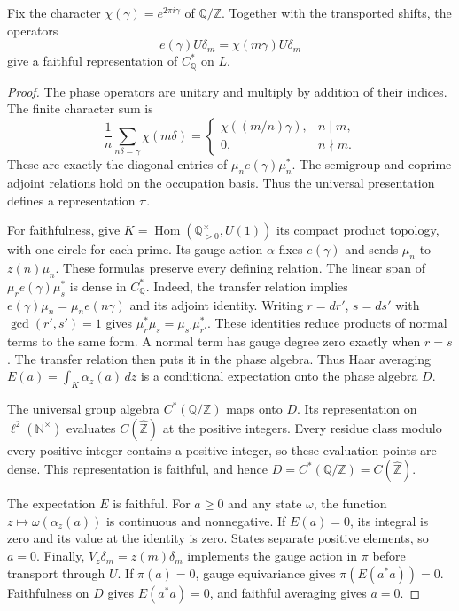 \begin{proposition}
\label{v4-arith:thm:BC-acts-on-L}

Fix the character $\chi(\gamma)=e^{2\pi i\gamma}$ of
$\mathbb Q/\mathbb Z$.
Together with the transported shifts, the operators
\[
 e(\gamma)U\delta_m=\chi(m\gamma)U\delta_m
\]
give a faithful representation of $C_{\mathbb Q}^*$ on $L$.
\end{proposition}
\begin{proof}
The phase operators are unitary and multiply by addition of their
indices. The finite character sum is
\[
 \frac1n\sum_{n\delta=\gamma}\chi(m\delta)=
 \begin{cases}
 \chi((m/n)\gamma),&n\mid m,\\
 0,&n\nmid m.
 \end{cases}
\]
These are exactly the diagonal entries of
$\mu_ne(\gamma)\mu_n^*$.
The semigroup and coprime adjoint relations hold on the occupation
basis. Thus the universal presentation defines a representation $\pi$.

For faithfulness, give
$K=\operatorname{Hom}(\mathbb Q_{>0}^{\times},U(1))$
its compact product topology, with one circle for each prime.
Its gauge action $\alpha$ fixes $e(\gamma)$ and sends $\mu_n$ to
$z(n)\mu_n$. These formulas preserve every defining relation.
The linear span of $\mu_r e(\gamma)\mu_s^*$ is dense in
$C_{\mathbb Q}^*$.
Indeed, the transfer relation implies
$e(\gamma)\mu_n=\mu_ne(n\gamma)$ and its adjoint identity.
Writing $r=dr'$, $s=ds'$ with $\gcd(r',s')=1$ gives
$\mu_r^*\mu_s=\mu_{s'}\mu_{r'}^*$.
These identities reduce products of normal terms to the same form.
A normal term has gauge degree zero exactly when $r=s$.
The transfer relation then puts it in the phase algebra.
Thus Haar averaging
$E(a)=\int_K\alpha_z(a)\,dz$ is a conditional expectation onto
the phase algebra $D$.

The universal group algebra $C^*(\mathbb Q/\mathbb Z)$ maps onto $D$.
Its representation on $\ell^2(\mathbb N^\times)$ evaluates
$C(\widehat{\mathbb Z})$ at the positive integers.
Every residue class modulo every positive integer contains a positive
integer, so these evaluation points are dense.
This representation is faithful, and hence
$D=C^*(\mathbb Q/\mathbb Z)=C(\widehat{\mathbb Z})$.

The expectation $E$ is faithful.
For $a\geq0$ and any state $\omega$, the function
$z\mapsto\omega(\alpha_z(a))$ is continuous and nonnegative.
If $E(a)=0$, its integral is zero and its value at the identity is zero.
States separate positive elements, so $a=0$.
Finally, $V_z\delta_m=z(m)\delta_m$ implements the gauge action
in $\pi$ before transport through $U$.
If $\pi(a)=0$, gauge equivariance gives $\pi(E(a^*a))=0$.
Faithfulness on $D$ gives $E(a^*a)=0$, and faithful averaging gives $a=0$.
\end{proof}

